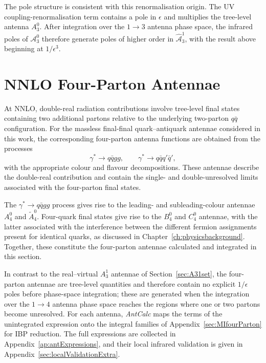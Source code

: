 The pole structure is consistent with this renormalisation origin. The UV
coupling-renormalisation term contains a pole in $\epsilon$ and multiplies the
tree-level antenna $A_3^0$. After integration over the $1\to3$ antenna phase space,
the infrared poles of $\mathcal A_3^0$ therefore generate poles of higher order in
$\hat{\mathcal A}_3^1$, with the result above beginning at $1/\epsilon^3$.

\section{NNLO Four-Parton Antennae}

At NNLO, double-real radiation contributions involve tree-level final states
containing two additional partons relative to the underlying two-parton $q\bar q$
configuration. For the massless final-final quark--antiquark antennae considered in
this work, the corresponding four-parton antenna functions are obtained from the
processes
\begin{equation*}
    \gamma^*\rightarrow q\bar qgg,\qquad
    \gamma^*\rightarrow q\bar q q'\bar q',
\end{equation*}
with the appropriate colour and flavour decompositions. These antennae describe the
double-real contribution and contain the single- and double-unresolved limits
associated with the four-parton final states.

The $\gamma^*\rightarrow q\bar qgg$ process gives rise to the leading- and
subleading-colour antennae $A_4^0$ and $\widetilde A_4^0$. Four-quark final states
give rise to the $B_4^0$ and $C_4^0$ antennae, with the latter associated with the
interference between the different fermion assignments present for identical quarks,
as discussed in Chapter~\ref{ch:physicsbackground}. Together, these constitute the
four-parton antennae calculated and integrated in this section.

In contrast to the real--virtual $A_3^1$ antennae of Section~\ref{sec:A31set}, the
four-parton antennae are tree-level quantities and therefore contain no explicit $1/\epsilon$
poles before phase-space integration; these are generated when the integration over the $1\to4$
antenna phase space reaches the regions where one or two partons become unresolved. For each antenna,
\textit{AntCalc} maps the terms of the unintegrated expression onto the integral families of
Appendix~\ref{sec:MIfourParton} for IBP reduction. The full expressions are collected in
Appendix~\ref{ap:antExpressions}, and their local infrared validation is given in
Appendix~\ref{sec:localValidationExtra}.

